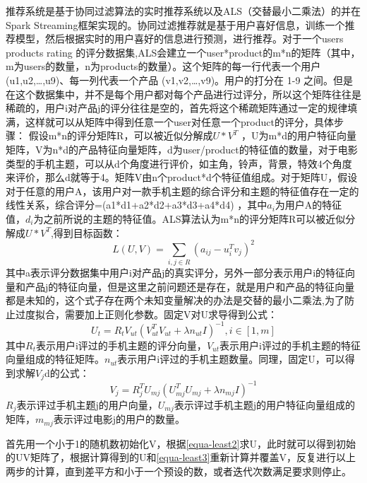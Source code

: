     推荐系统是基于协同过滤算法的实时推荐系统以及ALS（交替最小二乘法）的并在Spark Streaming框架实现的。协同过滤推荐就是基于用户喜好信息，训练一个推荐模型，然后根据实时的用户喜好的信息进行预测，进行推荐。对于一个users products rating 的评分数据集,ALS会建立一个user*product的m*n的矩阵（其中，m为users的数量，n为products的数量）。这个矩阵的每一行代表一个用户 (u1,u2,…,u9)、每一列代表一个产品 (v1,v2,…,v9)。用户的打分在 1-9 之间。但是在这个数据集中，并不是每个用户都对每个产品进行过评分，所以这个矩阵往往是稀疏的，用户i对产品j的评分往往是空的，首先将这个稀疏矩阵通过一定的规律填满，这样就可以从矩阵中得到任意一个user对任意一个product的评分，具体步骤：
    假设m*n的评分矩阵R，可以被近似分解成$U*V^{T}$ ，U为m*d的用户特征向量矩阵，V为n*d的产品特征向量矩阵，d为user/product的特征值的数量，对于电影类型的手机主题，可以从d个角度进行评价，如主角，铃声，背景，特效4个角度来评价，那么d就等于4。矩阵V由n个product*d个特征值组成。对于矩阵U，假设对于任意的用户A，该用户对一款手机主题的综合评分和主题的特征值存在一定的线性关系，综合评分=(a1*d1+a2*d2+a3*d3+a4*d4) ，其中$a_{i}$为用户A的特征值，$d_{i}$为之前所说的主题的特征值。ALS算法认为m*n的评分矩阵R可以被近似分解成$U*V^{T}$,得到目标函数：
    \begin{equation}
    L(U,V)=\sum_{i,j \in R}(a_{ij}-u_{i}^{T}v_{j})^{2}
    \label{F-Measure}
    \end{equation}
    其中a表示评分数据集中用户i对产品j的真实评分，另外一部分表示用户i的特征向量和产品j的特征向量，但是这里之前问题还是存在，就是用户和产品的特征向量都是未知的，这个式子存在两个未知变量解决的办法是交替的最小二乘法,为了防止过度拟合，需要加上正则化参数。固定V对U求导得到公式：
    \begin{equation}
    U_{t}=R_{t}V_{ut}(V_{ut}^TV_{ut}+\lambda n_{ut}I)^{-1}, i \in [1,m]
    \label{equa-least2}
    \end{equation}
    其中$R_{t}$表示用户i评过的手机主题的评分向量，$V_{ut}$表示用户i评过的手机主题的特征向量组成的特征矩阵。$n_{ut}$表示用户i评过的手机主题数量。同理，固定U，可以得到求解$V_{j}$d的公式：
    \begin{equation}
    V_{j}=R_{j}^{T}U_{mj}(U_{mj}^{T}U_{mj}+\lambda n_{mj}I)^{-1}
    \label{equa-least3}
    \end{equation}
    $R_{j}$表示评过手机主题j的用户向量，$U_{mj}$表示评过手机主题j的用户特征向量组成的矩阵，$m_{mj}$表示评过电影j的用户的数量。

    首先用一个小于1的随机数初始化V，根据\autoref{equa-least2}求U，此时就可以得到初始的UV矩阵了，根据计算得到的U和\autoref{equa-least3}重新计算并覆盖V，反复进行以上两步的计算，直到差平方和小于一个预设的数，或者迭代次数满足要求则停止。

